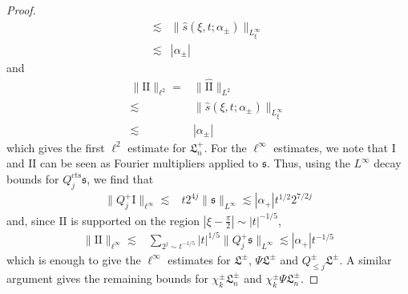 \documentclass[letterpaper, reqno,final]{amsart}
\newcommand{\fs}{\mathfrak{s}}
\newcommand{\fhPi}{\frac{\pi}{2}}
\newcommand{\fL}{\mathfrak{L}}
\newcommand{\rmI}{\mathrm{I}}
\newcommand{\rmII}{\mathrm{II}}
\newcommand{\tcts}{\text{cts}}
\begin{document}
\begin{proof}
\begin{equation*}
\begin{split}
        \lesssim& \lVert \hat{s}(\xi,t;\alpha_\pm) \rVert_{L^\infty_\xi}\\
        \lesssim& |\alpha_{\pm}|
    \end{split}\end{equation*}
    and
    \begin{equation*}\begin{split}
        \lVert \rmII \rVert_{\ell^2} =& \lVert \hat{\rmII} \rVert_{L^2}\\
        \lesssim& \lVert \hat{s}(\xi,t;\alpha_\pm) \rVert_{L^\infty_\xi}\\
        \lesssim& |\alpha_{\pm}|
    \end{split}
    \end{equation*}
    which gives the first $\ell^2$ estimate for $\fL_n^+$.  For the $\ell^\infty$ estimates, we note that $\rmI$ and $\rmII$ can be seen as Fourier multipliers applied to $\fs$.  Thus, using the $L^\infty$ decay bounds for $Q_j^\tcts \fs$, we find that
    \begin{equation*}\begin{split}
        \lVert Q_j^+ \rmI \rVert_{\ell^\infty} \lesssim& t 2^{4j} \lVert \fs \rVert_{L^\infty} \lesssim |\alpha_{+}| t^{1/2} 2^{7/2j}
    \end{split}\end{equation*}
    and, since $\rmII$ is supported on the region $|\xi - \fhPi| \sim |t|^{-1/5}$, 
    \begin{equation*}\begin{split}
        \lVert \rmII \rVert_{\ell^\infty} \lesssim& \sum_{2^j \sim t^{-1/5}} |t|^{1/5} \lVert Q_j^+ \fs \rVert_{L^\infty} \lesssim |\alpha_{+}| t^{-1/5}
    \end{split}\end{equation*}
    which is enough to give the  $\ell^\infty$ estimates for $\fL^\pm$, $\Psi \fL^\pm$ and $Q_{\leq j}^\pm \fL^\pm$.  A similar argument gives the remaining bounds for $\chi_k^\pm \fL_n^\pm$ and $\chi_k^\pm \Psi \fL_n^\pm$.
    

\end{proof}
\end{document}
